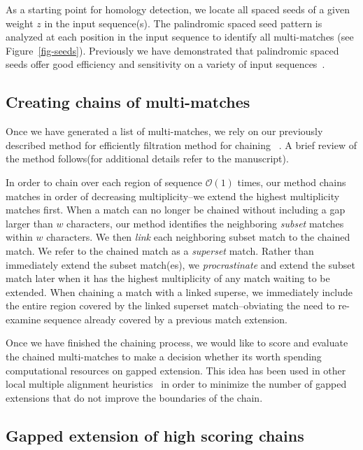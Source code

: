 \documentclass[twoside,11pt]{article}
\begin{document}
As a starting point for homology detection, we locate all spaced seeds of a given weight $z$ in the input sequence(s). The palindromic spaced seed pattern is analyzed at each position in the input sequence to identify all multi-matches (see Figure~\ref{fig-seeds}).  Previously we have demonstrated that palindromic spaced seeds offer good efficiency and sensitivity on a variety of input sequences~\cite{ref-procrast}.

\subsection{Creating chains of multi-matches}

Once we have generated a list of multi-matches, we rely on our previously described method for efficiently filtration method for chaining ~\cite{ref-procrast}. A brief review of the method follows(for additional details refer to the manuscript).

In order to chain over each region of sequence $\mathcal{O}(1)$ times,
our method chains matches in order of decreasing multiplicity--we
extend the highest multiplicity matches first. When a match can no
longer be chained without including a gap larger than $w$
characters, our method identifies the neighboring \textit{subset}
matches within $w$ characters. We then \textit{link} each
neighboring subset match to the chained match. We refer to the
chained match as a \textit{superset} match. Rather than immediately
extend the subset match(es), we \textit{procrastinate} and extend
the subset match later when it has the highest multiplicity of any
match waiting to be extended. When chaining a match with a linked
superse, we
immediately include the entire region covered by the linked superset
match--obviating the need to re-examine sequence already covered by
a previous match extension.

Once we have finished the chaining process, we would like to score and evaluate the chained multi-matches to make a decision whether its worth spending computational resources on gapped extension. This idea has been used in other local multiple alignment heuristics~\cite{...} in order to minimize the number of gapped extensions that do not improve the boundaries of the chain.

\subsection{Gapped extension of high scoring chains}
\end{document}
